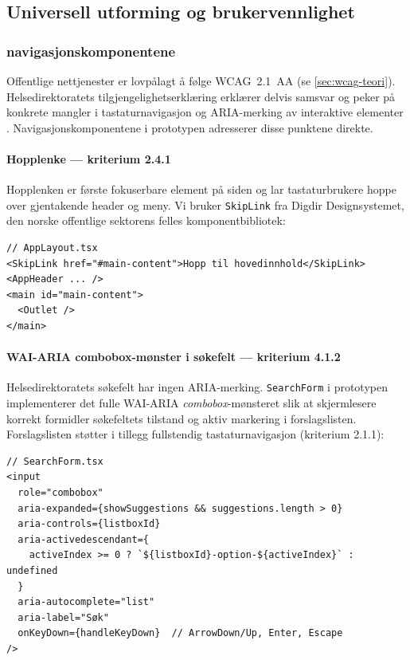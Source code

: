 \subsection{Universell utforming og brukervennlighet}
\label{sec:nav-wcag}

\subsubsection{navigasjonskomponentene}

Offentlige nettjenester er lovpålagt å følge WCAG~2.1~AA (se
\autoref{sec:wcag-teori}). Helsedirektoratets tilgjengelighetserklæring
erklærer delvis samsvar og peker på konkrete mangler i tastaturnavigasjon
og ARIA-merking av interaktive elementer \cite{uustatus-helsedir}.
Navigasjonskomponentene i prototypen adresserer disse punktene direkte.

\paragraph{Hopplenke --- kriterium 2.4.1}
Hopplenken er første fokuserbare element på siden og lar tastaturbrukere
hoppe over gjentakende header og meny. Vi bruker \texttt{SkipLink} fra
Digdir Designsystemet, den norske offentlige sektorens felles
komponentbibliotek:

\begin{verbatim}
// AppLayout.tsx
<SkipLink href="#main-content">Hopp til hovedinnhold</SkipLink>
<AppHeader ... />
<main id="main-content">
  <Outlet />
</main>
\end{verbatim}

\paragraph{WAI-ARIA combobox-mønster i søkefelt --- kriterium 4.1.2}
Helsedirektoratets søkefelt har ingen ARIA-merking. \texttt{SearchForm}
i prototypen implementerer det fulle WAI-ARIA \textit{combobox}-mønsteret
slik at skjermlesere korrekt formidler søkefeltets tilstand og aktiv
markering i forslagslisten. Forslagslisten støtter i tillegg fullstendig
tastaturnavigasjon (kriterium 2.1.1):

\begin{verbatim}
// SearchForm.tsx
<input
  role="combobox"
  aria-expanded={showSuggestions && suggestions.length > 0}
  aria-controls={listboxId}
  aria-activedescendant={
    activeIndex >= 0 ? `${listboxId}-option-${activeIndex}` : undefined
  }
  aria-autocomplete="list"
  aria-label="Søk"
  onKeyDown={handleKeyDown}  // ArrowDown/Up, Enter, Escape
/>
\end{verbatim}

